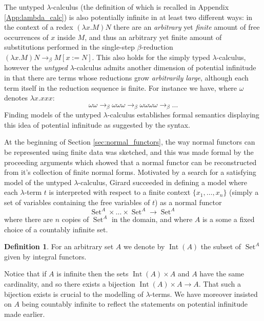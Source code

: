\documentclass[12pt]{article}
\theoremstyle{plain}
\theoremstyle{definition}
\newtheorem{defn}[thm]{Definition} %
\newcommand{\lto}{\longrightarrow}
\DeclareMathOperator{\set}{Set}
\begin{document}
The untyped $\lambda$-calculus (the definition of which is recalled in Appendix \ref{App:lambda_calc}) is also potentially infinite in at least two different ways: in the context of a redex $(\lambda x. M)N$ there are an \emph{arbitrary} yet \emph{finite} amount of free occurrences of $x$ inside $M$, and thus an arbitrary yet finite amount of substitutions performed in the single-step $\beta$-reduction $(\lambda x. M)N \lto_{\beta} M[x := N]$. This also holds for the simply typed $\lambda$-calculus, however the \emph{untyped} $\lambda$-calculus admits another dimension of potential infinitude in that there are terms whose reductions grow \emph{arbitrarily large}, although each term itself in the reduction sequence is finite. For instance we have, where $\omega$ denotes $\lambda x. xxx$:
\begin{equation*}
    \omega \omega \lto_{\beta} \omega \omega \omega \lto_{\beta} \omega \omega \omega \omega \lto_{\beta} \ldots
\end{equation*}
Finding models of the untyped $\lambda$-calculus establishes formal semantics displaying this idea of potential infinitude as suggested by the syntax.

At the beginning of Section \ref{sec:normal_functors}, the way normal functors can be represented using finite data was sketched, and this was made formal by the proceeding arguments which showed that a normal functor can be reconstructed from it's collection of finite normal forms. Motivated by a search for a satisfying model of the untyped $\lambda$-calculus, Girard succeeded in defining a model where each $\lambda$-term $t$ is interpreted with respect to a finite context $\{ x_1, \ldots, x_n \}$ (simply a set of variables containing the free variables of $t$) as a normal functor
\begin{equation*}
\set^{A} \times \ldots \times \set^{A} \lto \set^{A}
\end{equation*}
where there are $n$ copies of $\set^A$ in the domain, and where $A$ is a some a fixed choice of a countably infinite set.

\begin{defn}
    For an arbitrary set $A$ we denote by $\operatorname{Int}(A)$ the subset of $\set^A$ given by integral functors.
\end{defn}

Notice that if $A$ is infinite then the sets $\operatorname{Int}(A) \times A$ and $A$ have the same cardinality, and so there exists a bijection $\operatorname{Int}(A) \times A \lto A$. That such a bijection exists is crucial to the modelling of $\lambda$-terms. We have moreover insisted on $A$ being countably infinite to reflect the statements on potential infinitude made earlier.
\end{document}
